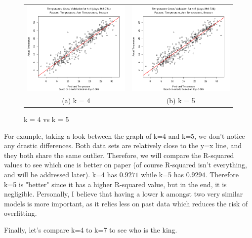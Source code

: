 \documentclass[12pt]{article}
\begin{document}
\begin{figure}[H]
\begin{tabular}{cc}
  \includegraphics[width=.5\linewidth]{tempxvalidk=4.png} &   \includegraphics[width=.5\linewidth]{tempxvalidk=5.png} \\
(a) k = 4 & (b) k = 5 \\[6pt]
\end{tabular}
\caption{k = 4 vs k = 5}
\end{figure}

For example, taking a look between the graph of k=4 and k=5, we don't notice any drastic differences. Both data sets are relatively close to the y=x line, and they both share the same outlier. Therefore, we will compare the R-squared values to see which one is better on paper (of course R-squared isn't everything, and will be addressed later). k=4 has $0.9271$ while k=5 has $0.9294$. Therefore k=5 is "better" since it has a higher R-squared value, but in the end, it is negligible. Personally, I believe that having a lower k amongst two very similar models is more important, as it relies less on past data which reduces the risk of overfitting.

Finally, let's compare k=4 to k=7 to see who is the king.
\end{document}
